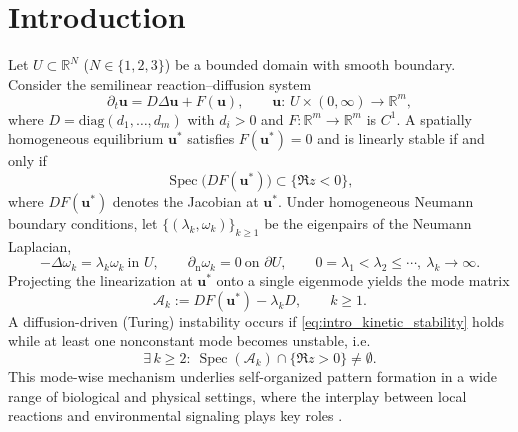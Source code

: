 \documentclass[pdflatex,sn-mathphys-ay]{sn-jnl}
\theoremstyle{thmstyleone}
\theoremstyle{definition}
\theoremstyle{remark}
\begin{document}

\maketitle


\section{Introduction}
\label{sec:introduction}

Let $U\subset\mathbb{R}^N$ ($N\in\{1,2,3\}$) be a bounded domain with smooth boundary.
Consider the semilinear reaction--diffusion system
\begin{equation}
\label{eq:intro_RD_general}
\partial_t \mathbf{u}=D\Delta \mathbf{u}+F(\mathbf{u}),\qquad 
\mathbf{u}:\,U\times(0,\infty)\to\mathbb{R}^m,
\end{equation}
where $D=\mathrm{diag}(d_1,\dots,d_m)$ with $d_i> 0$ and $F:\mathbb{R}^m\to\mathbb{R}^m$ is $C^1$.
A spatially homogeneous equilibrium $\mathbf{u}^*$ satisfies $F(\mathbf{u}^*)=0$ and is linearly stable if and only if
\begin{equation}
\label{eq:intro_kinetic_stability}
\operatorname{Spec}\bigl(DF(\mathbf{u}^*)\bigr)\subset\{\Re z<0\},
\end{equation}
where $DF(\mathbf{u}^*)$ denotes the Jacobian at $\mathbf{u}^*$.
Under homogeneous Neumann boundary conditions, let $\{(\lambda_k,\omega_k)\}_{k\ge1}$ be the eigenpairs of the Neumann Laplacian,
\[
-\Delta\omega_k=\lambda_k\omega_k \ \text{in }U,\qquad 
\partial_{\mathrm n}\omega_k=0 \ \text{on }\partial U,
\qquad 0=\lambda_1<\lambda_2\le\cdots,\ \lambda_k\to\infty.
\]
Projecting the linearization at $\mathbf{u}^*$ onto a single eigenmode yields the mode matrix
\begin{equation}
\label{eq:intro_mode_matrix}
\mathcal{A}_k := DF(\mathbf{u}^*)-\lambda_k D,\qquad k\ge 1.
\end{equation}
A diffusion-driven (Turing) instability occurs if \eqref{eq:intro_kinetic_stability} holds while at least one nonconstant mode becomes unstable, i.e.
\begin{equation}
\label{eq:intro_turing_condition}
\exists\,k\ge 2:\ \operatorname{Spec}(\mathcal{A}_k)\cap\{\Re z>0\}\neq\emptyset.
\end{equation}
This mode-wise mechanism underlies self-organized pattern formation in a wide range of biological and physical settings, where the interplay between local reactions and environmental signaling plays key roles \citep{cross_pattern_1993,dolnik_resonant_2001,colizza_reactiondiffusion_2007,belik_natural_2011}.
\end{document}
